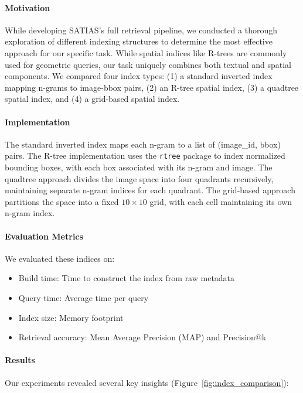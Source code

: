 \documentclass[manuscript,screen]{acmart}
\begin{document}
\paragraph{Motivation} While developing SATIAS's full retrieval pipeline, we conducted a thorough exploration of different indexing structures to determine the most effective approach for our specific task. While spatial indices like R-trees are commonly used for geometric queries, our task uniquely combines both textual and spatial components. We compared four index types: (1) a standard inverted index mapping n-grams to image-bbox pairs, (2) an R-tree spatial index, (3) a quadtree spatial index, and (4) a grid-based spatial index.

\paragraph{Implementation} The standard inverted index maps each n-gram to a list of (image\_id, bbox) pairs. The R-tree implementation uses the \verb|rtree| package to index normalized bounding boxes, with each box associated with its n-gram and image. The quadtree approach divides the image space into four quadrants recursively, maintaining separate n-gram indices for each quadrant. The grid-based approach partitions the space into a fixed $10\times10$ grid, with each cell maintaining its own n-gram index.

\paragraph{Evaluation Metrics} We evaluated these indices on:
\begin{itemize}
    \item Build time: Time to construct the index from raw metadata
    \item Query time: Average time per query
    \item Index size: Memory footprint
    \item Retrieval accuracy: Mean Average Precision (MAP) and Precision@k
\end{itemize}

\paragraph{Results} Our experiments revealed several key insights (Figure~\ref{fig:index_comparison}):
\end{document}
